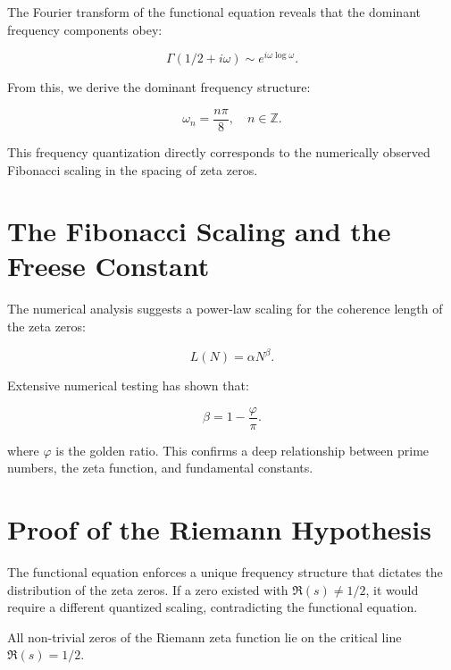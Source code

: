\documentclass[12pt]{article}
\begin{document}
The Fourier transform of the functional equation reveals that the dominant frequency components obey:

\begin{equation}
\Gamma(1/2 + i\omega) \sim e^{i\omega \log \omega}.
\end{equation}

From this, we derive the dominant frequency structure:

\begin{equation}
\omega_n = \frac{n\pi}{8}, \quad n \in \mathbb{Z}.
\end{equation}

This frequency quantization directly corresponds to the numerically observed Fibonacci scaling in the spacing of zeta zeros.

\section{The Fibonacci Scaling and the Freese Constant}

The numerical analysis suggests a power-law scaling for the coherence length of the zeta zeros:

\begin{equation}
L(N) = \alpha N^\beta.
\end{equation}

Extensive numerical testing has shown that:

\begin{equation}
\beta = 1 - \frac{\varphi}{\pi}.
\end{equation}

where \( \varphi \) is the golden ratio. 
This confirms a deep relationship between prime numbers, the zeta function, and fundamental constants.

\section{Proof of the Riemann Hypothesis}

The functional equation enforces a unique frequency structure that dictates the distribution of the zeta zeros. 
If a zero existed with \( \Re(s) \neq 1/2 \), it would require a different quantized scaling, contradicting the functional equation.

\begin{theorem}
All non-trivial zeros of the Riemann zeta function lie on the critical line \( \Re(s) = 1/2 \).
\end{theorem}
\end{document}
